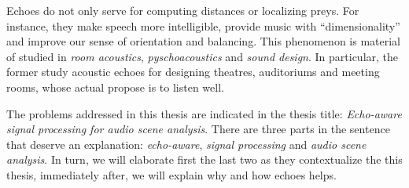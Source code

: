 \mynewline
Echoes do not only serve for computing distances or localizing preys.
For instance, they make speech more intelligible, provide music with ``dimensionality'' and improve our sense of orientation and balancing.
This phenomenon is material of studied in \textit{room acoustics}, \textit{pyschoacoustics} and \textit{sound design}.
In particular, the former study acoustic echoes for designing theatres, auditoriums and meeting rooms, whose actual propose is to listen well.

\mynewline
The problems addressed in this thesis are indicated in the thesis title: \textit{Echo-aware signal processing for audio scene analysis}.
There are three parts in the sentence that deserve an explanation: \textit{echo-aware}, \textit{signal processing} and \textit{audio scene analysis}.
In turn, we will elaborate first the last two as they contextualize the this thesis, immediately after, we will explain why and how echoes helps.


